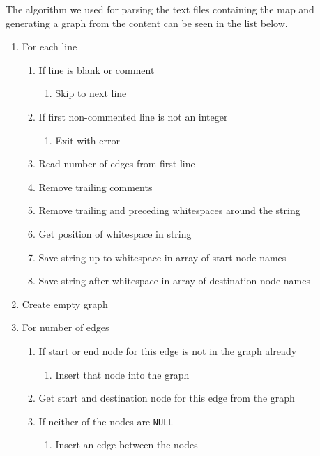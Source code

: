 \documentclass{article}
\begin{document}
The algorithm we used for parsing the text files containing the map and generating a graph from the content can be seen in the list below. 
\begin{enumerate}
    \item For each line
    \begin{enumerate}
        \item If line is blank or comment
        \begin{enumerate}
            \item Skip to next line
        \end{enumerate}
        \item If first non-commented line is not an integer
        \begin{enumerate}
            \item Exit with error
        \end{enumerate}
        \item Read number of edges from first line
        \item Remove trailing comments
        \item Remove trailing and preceding whitespaces around the string
        \item Get position of whitespace in string
        \item Save string up to whitespace in array of start node names
        \item Save string after whitespace in array of destination node names
    \end{enumerate}
    \item Create empty graph
    \item For number of edges
    \begin{enumerate}
        \item If start or end node for this edge is not in the graph already
        \begin{enumerate}
            \item Insert that node into the graph
        \end{enumerate}
        \item Get start and destination node for this edge from the graph
        \item If neither of the nodes are \texttt{NULL}
        \begin{enumerate}
            \item Insert an edge between the nodes
        \end{enumerate}
    \end{enumerate}
\end{enumerate}
\end{document}
